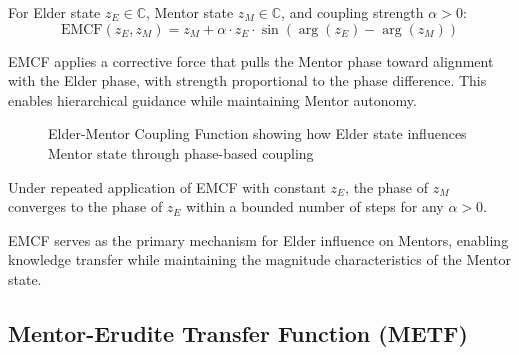 \begin{definition}
For Elder state $z_E \in \mathbb{C}$, Mentor state $z_M \in \mathbb{C}$, and coupling strength $\alpha > 0$:
\begin{equation}
\text{EMCF}(z_E, z_M) = z_M + \alpha \cdot z_E \cdot \sin(\arg(z_E) - \arg(z_M))
\end{equation}
\end{definition}

EMCF applies a corrective force that pulls the Mentor phase toward alignment with the Elder phase, with strength proportional to the phase difference. This enables hierarchical guidance while maintaining Mentor autonomy.

\begin{figure}[h]
\centering
{}
\caption{Elder-Mentor Coupling Function showing how Elder state influences Mentor state through phase-based coupling}
\end{figure}

\begin{proposition}
Under repeated application of EMCF with constant $z_E$, the phase of $z_M$ converges to the phase of $z_E$ within a bounded number of steps for any $\alpha > 0$.
\end{proposition}

EMCF serves as the primary mechanism for Elder influence on Mentors, enabling knowledge transfer while maintaining the magnitude characteristics of the Mentor state.

\subsection{Mentor-Erudite Transfer Function (METF)}

